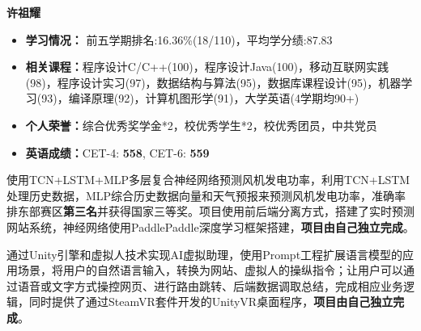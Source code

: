 {\Large\textbf{许祖耀}}\quad \quad \quad \quad {}


\begin{itemize}
  \item \textbf{学习情况：} 前五学期排名:16.36\%(18/110)，平均学分绩:87.83
  \item  \textbf{相关课程：}程序设计C/C++(100)，程序设计Java(100)，移动互联网实践(98)，程序设计实习(97)，数据结构与算法(95)，数据库课程设计(95)，机器学习(93)，编译原理(92)，计算机图形学(91)，大学英语(4学期均90+)
  \item  \textbf{个人荣誉：}综合优秀奖学金*2，校优秀学生*2，校优秀团员，中共党员
   \item  \textbf{英语成绩：}CET-4: \textbf{558}, CET-6: \textbf{559}
\end{itemize}



使用TCN+LSTM+MLP多层复合神经网络预测风机发电功率，利用TCN+LSTM处理历史数据，MLP综合历史数据向量和天气预报来预测风机发电功率，准确率排东部赛区\textbf{第三名}并获得国家三等奖。项目使用前后端分离方式，搭建了实时预测网站系统，神经网络使用PaddlePaddle深度学习框架搭建，\textbf{项目由自己独立完成}。

\vspace{8pt}
通过Unity引擎和虚拟人技术实现AI虚拟助理，使用Prompt工程扩展语言模型的应用场景，将用户的自然语言输入，转换为网站、虚拟人的操纵指令；让用户可以通过语音或文字方式操控网页、进行路由跳转、后端数据调取总结，完成相应业务逻辑，同时提供了通过SteamVR套件开发的UnityVR桌面程序，\textbf{项目由自己独立完成}。

